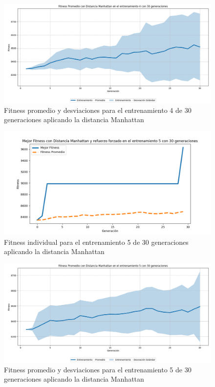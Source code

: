 \documentclass[conference]{IEEEtran}
\begin{document}
\begin{figure}[H]
    \centering
    \includegraphics[width=0.9 \linewidth]{Manhattan/Fitness_individual_30Gen/Fitness_4_Mahn_30Gen_Sombra.png}
    \caption{Fitness promedio y desviaciones para el entrenamiento 4 de 30 generaciones aplicando la distancia Manhattan}
    \label{fig:manhattan_4_30_sombra}
\end{figure}

\begin{figure}[H]
    \centering
    \includegraphics[width=0.9 \linewidth]{Manhattan/Fitness_individual_30Gen/Fitness_5_Mahn_30Gen.png}
    \caption{Fitness individual para el entrenamiento 5 de 30 generaciones aplicando la distancia Manhattan}
    \label{fig:manhattan_5_30}
\end{figure}
\begin{figure}[H]
    \centering
    \includegraphics[width=0.9 \linewidth]{Manhattan/Fitness_individual_30Gen/Fitness_5_Mahn_30Gen_Sombra.png}
    \caption{Fitness promedio y desviaciones para el entrenamiento 5 de 30 generaciones aplicando la distancia Manhattan}
    \label{fig:manhattan_5_30_sombra}
\end{figure}
\end{document}
